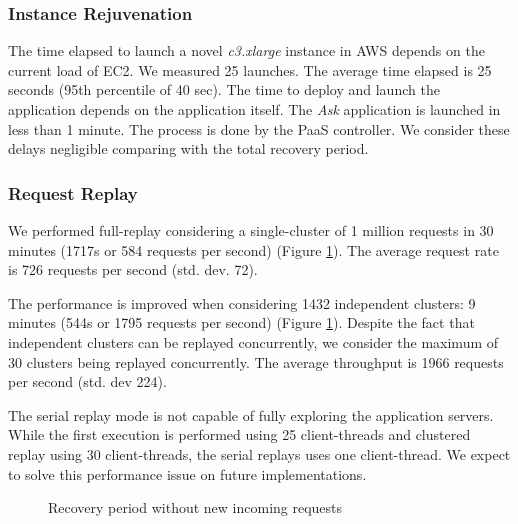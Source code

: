 \subsubsection{Instance Rejuvenation}\label{sec:eval:recovery:rejunation}
The time elapsed to launch a novel \emph{c3.xlarge} instance in \ac{AWS} depends on the current load of EC2. We measured 25 launches. The average time elapsed is 25 seconds (95th percentile of 40 sec). The time to deploy and launch the application depends on the application itself. The \emph{Ask} application is launched in less than 1 minute. The process is done by the \ac{PaaS} controller. We consider these delays negligible comparing with the total recovery period.\\

  
\subsubsection{Request Replay}\label{sec:eval:recovery:replay}
We performed full-replay considering a single-cluster of 1 million requests in 30 minutes (1717s or 584 requests per second) (Figure \ref{fig:recovery_period}). The average request rate is 726 requests per second (std. dev. 72). %

The performance is improved when considering 1432 independent clusters: 9 minutes (544s or 1795 requests per second) (Figure \ref{fig:recovery_period}). Despite the fact that independent clusters can be replayed concurrently, we consider the maximum of 30 clusters being replayed concurrently. The average throughput is 1966 requests per second (std. dev 224).

The serial replay mode is not capable of fully exploring the application servers. While the first execution is performed using 25 client-threads and clustered replay using 30 client-threads, the serial replays uses one client-thread. We expect to solve this performance issue on future implementations. 
    
\begin{figure}[!htb] 
    \centering
    \resizebox{0.7\linewidth}{!}{}
    \caption{Recovery period without new incoming requests}
    \label{fig:recovery_period}
\end{figure}





